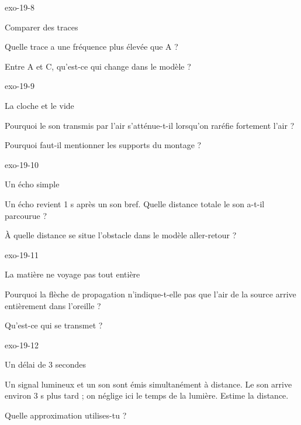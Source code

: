 \documentclass[12pt,twoside,openany]{book}
\begin{document}
\begin{blocLivre}{exo-19-8}
\begin{exercice}[2]{Comparer des traces}
\begin{questions}
\item Quelle trace a une fréquence plus élevée que A ?
\item Entre A et C, qu’est-ce qui change dans le modèle ?
\end{questions}
\end{exercice}\end{blocLivre}
\begin{blocLivre}{exo-19-9}
\begin{exercice}[2]{La cloche et le vide}
\begin{questions}
\item Pourquoi le son transmis par l’air s’atténue-t-il lorsqu’on raréfie fortement l’air ?
\item Pourquoi faut-il mentionner les supports du montage ?
\end{questions}
\end{exercice}\end{blocLivre}
\begin{blocLivre}{exo-19-10}
\begin{exercice}[2]{Un écho simple}
\begin{questions}
\item Un écho revient 1 s après un son bref. Quelle distance totale le son a-t-il parcourue ?
\item À quelle distance se situe l’obstacle dans le modèle aller-retour ?
\end{questions}
\end{exercice}\end{blocLivre}
\begin{blocLivre}{exo-19-11}
\begin{exercice}[2]{La matière ne voyage pas tout entière}
\begin{questions}
\item Pourquoi la flèche de propagation n’indique-t-elle pas que l’air de la source arrive entièrement dans l’oreille ?
\item Qu’est-ce qui se transmet ?
\end{questions}
\end{exercice}\end{blocLivre}
\clearpage
\begin{blocLivre}{exo-19-12}
\begin{exercice}[3]{Un délai de 3 secondes}
\begin{questions}
\item Un signal lumineux et un son sont émis simultanément à distance. Le son arrive environ 3 s plus tard ; on néglige ici le temps de la lumière. Estime la distance.
\item Quelle approximation utilises-tu ?
\end{questions}
\end{exercice}\end{blocLivre}
\end{document}
